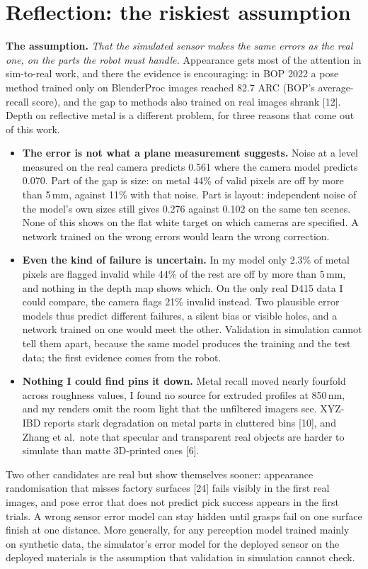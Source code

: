 \documentclass[10pt,a4paper]{article}
\newcommand{\para}[1]{\textbf{#1}\enspace}
\newcommand{\cte}[1]{[#1]}
\begin{document}
\section{Reflection: the riskiest assumption}
\para{The assumption.} \emph{That the simulated sensor makes the same errors as the real one, on the parts the robot must handle.} Appearance gets most of the attention in sim-to-real work, and there the evidence is encouraging: in BOP 2022 a pose method trained only on BlenderProc images reached 82.7 ARC (BOP's average-recall score), and the gap to methods also trained on real images shrank \cte{12}. Depth on reflective metal is a different problem, for three reasons that come out of this work.
\begin{itemize}
\item \textbf{The error is not what a plane measurement suggests.} Noise at a level measured on the real camera predicts 0.561 where the camera model predicts 0.070. Part of the gap is size: on metal 44\% of valid pixels are off by more than 5\,mm, against 11\% with that noise. Part is layout: independent noise of the model's own sizes still gives 0.276 against 0.102 on the same ten scenes. None of this shows on the flat white target on which cameras are specified. A network trained on the wrong errors would learn the wrong correction.
\item \textbf{Even the kind of failure is uncertain.} In my model only 2.3\% of metal pixels are flagged invalid while 44\% of the rest are off by more than 5\,mm, and nothing in the depth map shows which. On the only real D415 data I could compare, the camera flags 21\% invalid instead. Two plausible error models thus predict different failures, a silent bias or visible holes, and a network trained on one would meet the other. Validation in simulation cannot tell them apart, because the same model produces the training and the test data; the first evidence comes from the robot.
\item \textbf{Nothing I could find pins it down.} Metal recall moved nearly fourfold across roughness values, I found no source for extruded profiles at 850\,nm, and my renders omit the room light that the unfiltered imagers see. XYZ-IBD reports stark degradation on metal parts in cluttered bins \cte{10}, and Zhang et al.\ note that specular and transparent real objects are harder to simulate than matte 3D-printed ones \cte{6}.
\end{itemize}
Two other candidates are real but show themselves sooner: appearance randomisation that misses factory surfaces \cte{24} fails visibly in the first real images, and pose error that does not predict pick success appears in the first trials. A wrong sensor error model can stay hidden until grasps fail on one surface finish at one distance. More generally, for any perception model trained mainly on synthetic data, the simulator's error model for the deployed sensor on the deployed materials is the assumption that validation in simulation cannot check.
\end{document}
